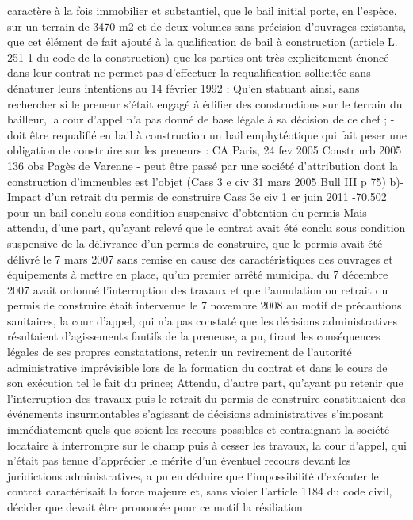 \documentclass[11pt,a4paper]{report}
\begin{document}
	caractère à la fois immobilier et substantiel, que le bail initial porte, en l'espèce, sur un terrain de 3470 m2 et de
	deux volumes sans précision d'ouvrages existants, que cet élément de fait ajouté à la qualification de bail à
	construction (article L. 251-1 du code de la construction) que les parties ont très explicitement énoncé dans leur
	contrat ne permet pas d'effectuer la requalification sollicitée sans dénaturer leurs intentions au 14 février 1992 ;
	Qu'en statuant ainsi, sans rechercher si le preneur s'était engagé à édifier des constructions sur le terrain du
	bailleur, la cour d'appel n'a pas donné de base légale à sa décision de ce chef ;
	- doit être requalifié en bail à construction un bail emphytéotique qui fait peser une obligation de construire sur
	les preneurs : CA Paris, 24 fev 2005 Constr urb 2005 136 obs Pagès de Varenne
	- peut être passé par une société d’attribution dont la construction d’immeubles est l’objet (Cass 3 e civ 31 mars
	2005 Bull III  p 75)
	b)-Impact d’un retrait du permis de construire
	Cass 3e civ 1 er juin 2011 -70.502 pour un bail conclu sous condition suspensive d’obtention du permis
	Mais attendu, d’une part, qu’ayant relevé que le contrat avait été conclu sous condition suspensive de la
	délivrance d’un permis de construire, que le permis avait été délivré le 7 mars 2007 sans remise en cause des
	caractéristiques des ouvrages et équipements à mettre en place, qu’un premier arrêté municipal du 7 décembre
	2007 avait ordonné l’interruption des travaux et que l’annulation ou retrait du permis de construire était
	intervenue le 7 novembre 2008 au motif de précautions sanitaires, la cour d’appel, qui n’a pas constaté que les
	décisions administratives résultaient d’agissements fautifs de la preneuse, a pu, tirant les conséquences légales
	de ses propres constatations, retenir un revirement de l’autorité administrative imprévisible lors de la formation
	du contrat et dans le cours de son exécution tel le fait du prince;
	Attendu, d’autre part, qu’ayant pu retenir que l’interruption des travaux puis le retrait du permis de construire
	constituaient des événements insurmontables s’agissant de décisions administratives s’imposant immédiatement
	quels que soient les recours possibles et contraignant la société locataire à interrompre sur le champ puis à
	cesser les travaux, la cour d’appel, qui n’était pas tenue d’apprécier le mérite d’un éventuel recours devant les
	juridictions administratives, a pu en déduire que l’impossibilité d’exécuter le contrat caractérisait la force
	majeure et, sans violer l’article 1184 du code civil, décider que devait être prononcée pour ce motif la résiliation
\end{document}
